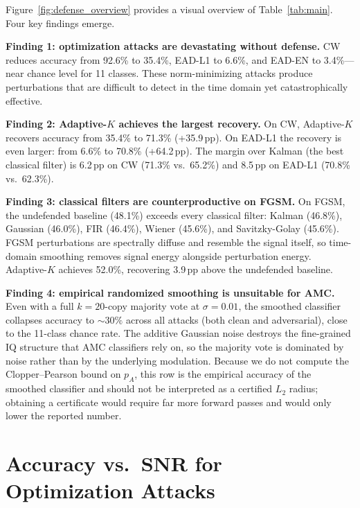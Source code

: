 Figure~\ref{fig:defense_overview} provides a visual overview of
Table~\ref{tab:main}. Four key findings emerge.

\textbf{Finding 1: optimization attacks are devastating without defense.}
CW reduces accuracy from 92.6\% to 35.4\%, EAD-L1 to 6.6\%, and EAD-EN to
3.4\%---near chance level for 11 classes. These norm-minimizing attacks
produce perturbations that are difficult to detect in the time domain yet
catastrophically effective.

\textbf{Finding 2: Adaptive-$K$ achieves the largest recovery.}
On CW, Adaptive-$K$ recovers accuracy from 35.4\% to 71.3\% (+35.9\,pp).
On EAD-L1 the recovery is even larger: from 6.6\% to 70.8\% (+64.2\,pp).
The margin over Kalman (the best classical filter) is 6.2\,pp on CW
(71.3\% vs.\ 65.2\%) and 8.5\,pp on EAD-L1 (70.8\% vs.\ 62.3\%).

\textbf{Finding 3: classical filters are counterproductive on FGSM.}
On FGSM, the undefended baseline (48.1\%) exceeds every classical filter:
Kalman (46.8\%), Gaussian (46.0\%), FIR (46.4\%), Wiener (45.6\%), and
Savitzky-Golay (45.6\%). FGSM perturbations are spectrally diffuse and
resemble the signal itself, so time-domain smoothing removes signal energy
alongside perturbation energy. Adaptive-$K$ achieves 52.0\%, recovering
3.9\,pp above the undefended baseline.

\textbf{Finding 4: empirical randomized smoothing is unsuitable for AMC.}
Even with a full $k = 20$-copy majority vote at $\sigma = 0.01$, the
smoothed classifier collapses accuracy to $\sim 30\%$ across all attacks
(both clean and adversarial), close to the 11-class chance rate. The
additive Gaussian noise destroys the fine-grained IQ structure that AMC
classifiers rely on, so the majority vote is dominated by noise rather
than by the underlying modulation. Because we do not compute the
Clopper--Pearson bound on $p_A$, this row is the empirical accuracy of
the smoothed classifier and should not be interpreted as a certified
$L_2$ radius; obtaining a certificate would require far more forward
passes and would only lower the reported number.

\section{Accuracy vs.\ SNR for Optimization Attacks}

